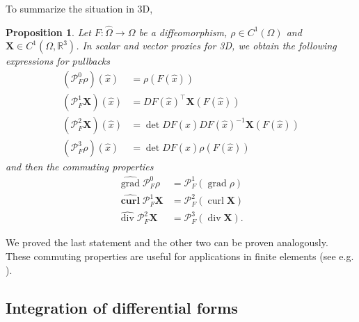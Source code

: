 \documentclass[12pt,a4paper]{article}
\numberwithin{equation}{subsection}
\numberwithin{lemma}{subsection}
\newtheorem{proposition}[lemma]{Proposition}
\theoremstyle{definition}
\DeclareMathOperator{\curl}{curl}
\DeclareMathOperator{\diver}{div}
\DeclareMathOperator{\grad}{grad}
\newcommand{\real}{\mathbb{R}}
\begin{document}
To summarize the situation in 3D,
\begin{proposition}
    Let $F: \hat{\Omega} \rightarrow \Omega$ be a diffeomorphism, 
    $\rho \in C^1(\Omega)$ and $\mathbf{X} \in C^1(\Omega, \real^3)$.
    In scalar and vector proxies for 3D, we obtain the following expressions for 
    pullbacks
    \begin{align*}
        (\mathcal{P}^0_F \rho)(\hat{x}) &= \rho(F(\hat{x}))
        \\ (\mathcal{P}^1_F \mathbf{X})(\hat{x}) &= DF(\hat{x})^\top \mathbf{X}(F(\hat{x}))
        \\ (\mathcal{P}^2_F \mathbf{X})(\hat{x}) &= \det DF(\hat{x}) DF(\hat{x})^{-1} \mathbf{X}(F(\hat{x}))
        \\ (\mathcal{P}^3_F \rho)(\hat{x}) &= \det DF(\hat{x}) \rho(F(\hat{x}))
    \end{align*}
    and then the commuting properties
    \begin{align*}
        \widehat{\grad} \mathcal{P}^0_F \rho &= \mathcal{P}^1_F (\grad \rho)
        \\ \widehat{\mathbf{\curl}} \mathcal{P}^1_F \mathbf{X} &= \mathcal{P}^2_F (\curl \mathbf{X})
        \\ \widehat{\diver} \mathcal{P}^2_F \mathbf{X} &= \mathcal{P}^3_F (\diver \mathbf{X}).
    \end{align*}
\end{proposition}
We proved the last statement and the other two can be proven analogously. 
These commuting properties are useful for applications in finite elements
(see e.g. \cite[Sec.\,14.3]{ern_guermond}).





\subsection{Integration of differential forms}

\end{document}
